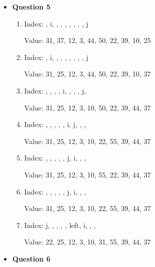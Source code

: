 \documentclass{article}
\begin{document}
\begin{itemize}
    \item\textbf{ Question 5}

    \begin{enumerate}
        \item Index: {, \space i, , , , \space{}, \space{}, , , \space\space j}
    
            Value: {31, 37, 12, 3, 44, 50, 22, 39, 10, 25}

        \item Index: {, \space i, , , , \space{}, \space{}, , , \space\space j}
    
            Value: {31, 25, 12, 3, 44, 50, 22, 39, 10, 37}

        \item Index: {, , , , \space i, \space{}, \space{}, , \space j, \space{}}
    
            Value: {31, 25, 12, 3, 10, 50, 22, 39, 44, 37}

        \item Index: {, , , , , \space\space i, \space\space j, , , \space{}}
    
            Value: {31, 25, 12, 3, 10, 22, 55, 39, 44, 37}

        \item Index: {, , , , , \space\space j, \space\space i, , , \space{}}
    
            Value: {31, 25, 12, 3, 10, 55, 22, 39, 44, 37}

        \item Index: {, , , , , \space\space j, \space\space i, , , \space{}}
    
            Value: {31, 25, 12, 3, 10, 22, 55, 39, 44, 37}

        \item Index: {\space j, , , , , \space left, \space\space i, , , \space{}}
    
            Value: {22, 25, 12, 3, 10, 31, 55, 39, 44, 37}

    \end{enumerate}

    \item\textbf{ Question 6}


\end{itemize}
\end{document}
